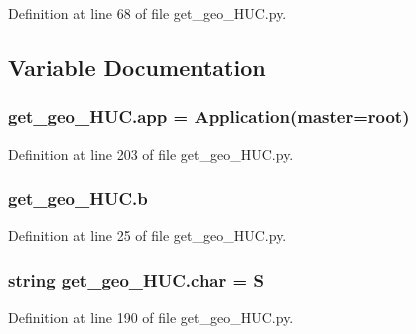 Definition at line 68 of file get\+\_\+geo\+\_\+\+H\+U\+C.\+py.



\subsection{Variable Documentation}
\subsubsection[{\texorpdfstring{app}{app}}]{\setlength{\rightskip}{0pt plus 5cm}get\+\_\+geo\+\_\+\+H\+U\+C.\+app = {\bf Application}(master={\bf root})}\hypertarget{namespaceget__geo___h_u_c_ae7441cdd21124e2861a4383ed6aa35dd}{}\label{namespaceget__geo___h_u_c_ae7441cdd21124e2861a4383ed6aa35dd}


Definition at line 203 of file get\+\_\+geo\+\_\+\+H\+U\+C.\+py.

\subsubsection[{\texorpdfstring{b}{b}}]{\setlength{\rightskip}{0pt plus 5cm}get\+\_\+geo\+\_\+\+H\+U\+C.\+b}\hypertarget{namespaceget__geo___h_u_c_a6756d51ec2f6d391eddbc37c88a3369c}{}\label{namespaceget__geo___h_u_c_a6756d51ec2f6d391eddbc37c88a3369c}


Definition at line 25 of file get\+\_\+geo\+\_\+\+H\+U\+C.\+py.

\subsubsection[{\texorpdfstring{char}{char}}]{\setlength{\rightskip}{0pt plus 5cm}string get\+\_\+geo\+\_\+\+H\+U\+C.\+char = \textquotesingle{}S\textquotesingle{}}\hypertarget{namespaceget__geo___h_u_c_a889ac010fb56a383bcd7632fea041a9e}{}\label{namespaceget__geo___h_u_c_a889ac010fb56a383bcd7632fea041a9e}


Definition at line 190 of file get\+\_\+geo\+\_\+\+H\+U\+C.\+py.

